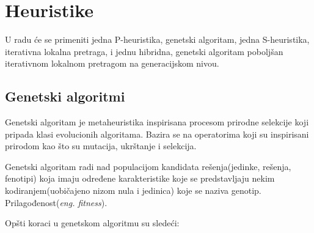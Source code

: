 \documentclass[a4paper]{article}
\begin{document}
\section{Heuristike}
U radu će se primeniti jedna P-heuristika, genetski algoritam, jedna S-heuristika, iterativna lokalna pretraga, i jednu hibridna, genetski algoritam poboljšan iterativnom lokalnom pretragom na generacijskom nivou.
\subsection{Genetski algoritmi}
Genetski algoritam je metaheuristika inspirisana procesom prirodne selekcije koji pripada klasi evolucionih algoritama. Bazira se na operatorima koji su inspirisani prirodom kao što su mutacija, ukrštanje i selekcija\cite{mitchellbook}.


Genetski algoritam radi nad populacijom kandidata rešenja(jedinke, rešenja, fenotipi) koja imaju određene karakteristike koje se predstavljaju nekim kodiranjem(uobičajeno nizom nula i jedinica) koje se naziva genotip.\cite{whitley} Prilagođenost(\emph {eng. fitness}).

Opšti koraci u genetskom algoritmu su sledeći:
\end{document}
